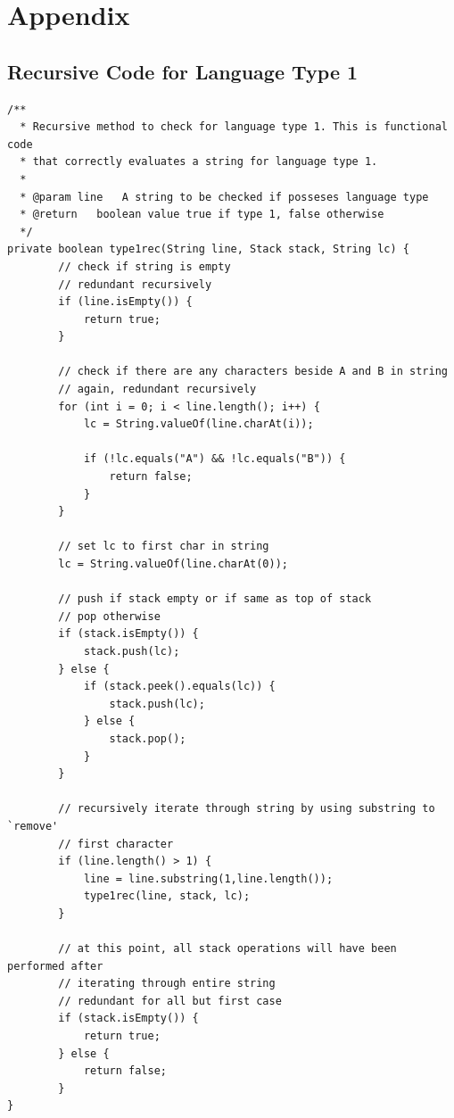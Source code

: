 \documentclass[12pt, titlepage]{article}
\begin{document}
\newpage

\section{Appendix}
\subsection{Recursive Code for Language Type 1}
\begin{lstlisting}
/**
  * Recursive method to check for language type 1. This is functional code 
  * that correctly evaluates a string for language type 1.
  *
  * @param line   A string to be checked if posseses language type
  * @return   boolean value true if type 1, false otherwise
  */
private boolean type1rec(String line, Stack stack, String lc) {
        // check if string is empty
        // redundant recursively
        if (line.isEmpty()) {
            return true;
        }

        // check if there are any characters beside A and B in string
        // again, redundant recursively
        for (int i = 0; i < line.length(); i++) {
            lc = String.valueOf(line.charAt(i));

            if (!lc.equals("A") && !lc.equals("B")) {
                return false;
            }
        }

        // set lc to first char in string
        lc = String.valueOf(line.charAt(0));

        // push if stack empty or if same as top of stack
        // pop otherwise
        if (stack.isEmpty()) {
            stack.push(lc);
        } else {
            if (stack.peek().equals(lc)) {
                stack.push(lc);
            } else {
                stack.pop();
            }
        }

        // recursively iterate through string by using substring to `remove'
        // first character
        if (line.length() > 1) {
            line = line.substring(1,line.length());
            type1rec(line, stack, lc);
        }

        // at this point, all stack operations will have been performed after
        // iterating through entire string
        // redundant for all but first case
        if (stack.isEmpty()) {
            return true;
        } else {
            return false;
        }
}
\end{lstlisting}
\end{document}
